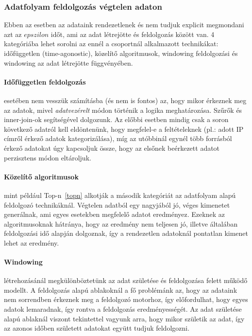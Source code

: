 \documentclass[a4paper,12pt]{article}
\begin{document}
\subsubsection{Adatfolyam feldolgozás végtelen adaton}
Ebben az esetben az adataink rendezetlenek és nem tudjuk explicit megmondani azt az $epszilon$ időt, ami az adat létrejötte és feldolgozás között van. 4 kategóriába lehet sorolni az ennél a csoportnál alkalmazott technikákat: időfüggetlen (time-agonostic), közelítő algoritmusok, windowing feldolgozási és windowing az adat létrejötte függvényében. 

\paragraph{Időfüggetlen feldolgozás}\hspace*{-0.4cm} esetében nem vesszük számításba (és nem is fontos) az, hogy mikor érkeznek meg az adatok, mivel \textsl{adatvezérelt} módon történik a logika meghatározása. Szűrők és inner-join-ok segítségével dolgozunk. Az előbbi esetben mindig csak a soron következő adatról kell eldöntenünk, hogy megfelel-e a feltételeknek (pl.: adott IP címről érkező adatok kategorizálása), míg az utóbbinál egynél több forrásból érkező adatokat úgy kapcsoljuk össze, hogy az elsőnek beérkezett adatot perzisztens módon eltároljuk. 

\paragraph{Közelítő algoritmusok}\hspace*{-0.4cm} mint például Top-n~\ref{topn} alkotják a második kategóriát az adatfolyam alapú feldolgozó technikáknál. Végtelen adatból egy nagyjából jó, véges kimenetet generálnak, ami egyes esetekben megfelelő adatot eredményez. Ezeknek az algoritmusoknak hátránya, hogy az eredmény nem teljesen jó, illetve általában feldolgozási idő alapján dolgoznak, így a rendezetlen adatoknál pontatlan kimenet lehet az eredmény.

\paragraph{Windowing}\hspace*{-0.4cm} létrehozásánál megkülönböztetünk az adat születése és feldolgozása felett működő modellt. A feldolgozás alapú ablakoknál a fő problémánk az, hogy az adataink nem sorrendben érkeznek meg a feldolgozó motorhoz, így előfordulhat, hogy egyes adatok lemaradnak, így rontva a feldolgozás eredményességét. Az adat születése alapú ablaknál viszont tekintettel vagyunk arra, hogy mikor születik az adat, így az azonos időben született adatokat együtt tudjuk feldolgozni.
\end{document}
